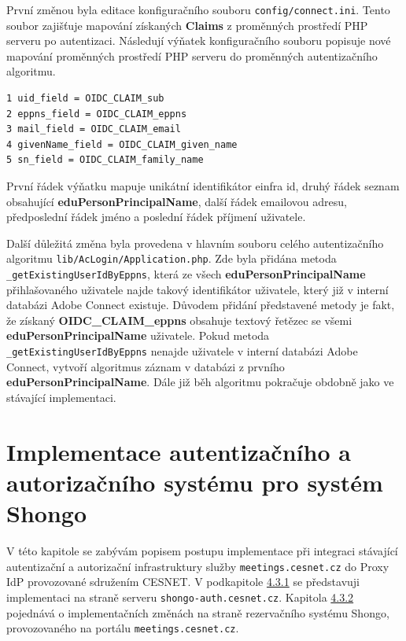 \documentclass[
  printed, %
  twoside, %
  table,   %
  nolof,     %
  nolot,     %
]{fithesis3}
\begin{document}
První změnou byla editace konfiguračního souboru \texttt{config/connect.ini}. Tento soubor zajišťuje mapování získaných \textbf{Claims} z proměnných prostředí PHP serveru po autentizaci. Následují výňatek konfiguračního souboru popisuje nové mapování proměnných prostředí PHP serveru do proměnných autentizačního algoritmu. 

\begin{lstlisting}
1 uid_field = OIDC_CLAIM_sub
2 eppns_field = OIDC_CLAIM_eppns
3 mail_field = OIDC_CLAIM_email
4 givenName_field = OIDC_CLAIM_given_name
5 sn_field = OIDC_CLAIM_family_name
\end{lstlisting}
První řádek výňatku mapuje unikátní identifikátor einfra id, druhý řádek seznam obsahující \textbf{eduPersonPrincipalName}, další řádek emailovou adresu, předposlední řádek jméno a poslední řádek příjmení uživatele.  \par 

Další důležitá změna byla provedena v hlavním souboru celého autentizačního algoritmu \texttt{lib/AcLogin/Application.php}. Zde byla přidána metoda \texttt{\_getExistingUserIdByEppns}, která ze všech \textbf{eduPersonPrincipalName} přihlašovaného uživatele najde takový identifikátor uživatele, který již v interní databázi Adobe Connect existuje. Důvodem přidání představené metody je fakt, že získaný \textbf{ OIDC\_CLAIM\_eppns}  obsahuje textový řetězec se všemi \textbf{eduPersonPrincipalName} uživatele. Pokud metoda \texttt{\_getExistingUserIdByEppns} nenajde uživatele v interní databázi Adobe Connect, vytvoří algoritmus záznam v databázi z prvního \textbf{eduPersonPrincipalName}. Dále již běh algoritmu pokračuje obdobně jako ve stávající implementaci. \par

\section{Implementace autentizačního a autorizačního systému pro systém Shongo}
\label{ShongoImpl}
V této kapitole se zabývám popisem postupu implementace při integraci stávající autentizační a autorizační infrastruktury služby \texttt{meetings.cesnet.cz} do Proxy IdP provozované sdružením CESNET. V podkapitole \hyperref[ShongoImpl-authn]{4.3.1} se představuji implementaci na straně serveru \texttt{shongo-auth.cesnet.cz}. Kapitola \hyperref[ShongoImpl-authn]{4.3.2} pojednává o implementačních změnách na straně rezervačního systému Shongo, provozovaného na portálu \texttt{meetings.cesnet.cz}. 
\end{document}
